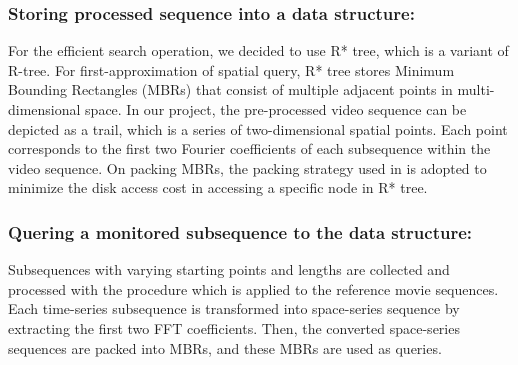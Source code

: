 \subsubsection{Storing processed sequence into a data structure:} 
For the efficient search operation, we decided to use R* tree\cite{Beckmann:1990}, which is a variant of R-tree. For first-approximation of spatial query, R* tree stores Minimum Bounding Rectangles (MBRs) that consist of multiple adjacent points in multi-dimensional space. In our project, the pre-processed video sequence can be depicted as a trail, which is a series of two-dimensional spatial points. Each point corresponds to the first two Fourier coefficients of each subsequence within the video sequence. On packing MBRs, the packing strategy used in \cite{Faloutsos:1994}\cite{Kamel:1993} is adopted to minimize the disk access cost in accessing a specific node in R* tree.

\subsubsection{Quering a monitored subsequence to the data structure:} Subsequences with varying starting points and lengths are collected and processed with the procedure which is applied to the reference movie sequences. Each time-series subsequence is transformed into space-series sequence by extracting the first two FFT coefficients. Then, the converted space-series sequences are packed into MBRs, and these MBRs are used as queries.

